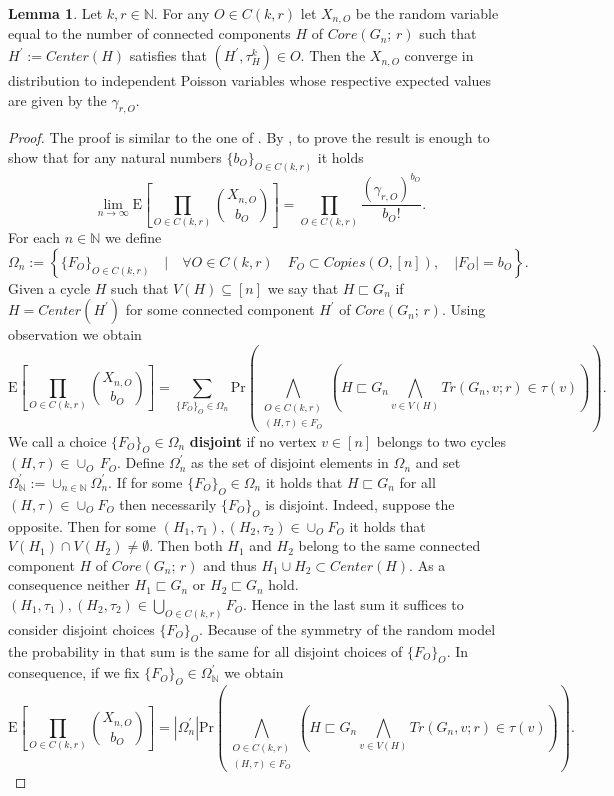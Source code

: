 \documentclass[12pt,notitlepage,a4paper]{article}
\theoremstyle{definition}
\newtheorem{lemma}{Lemma}[section]
\newcommand{\N}{\mathbb{N}}
\newcommand{\Ln}{\lim\limits_{n\to \infty}}
\begin{document}
\begin{lemma}
	Let $k,r\in \N$. For any $O\in C(k,r)$ let $X_{n,O}$ be
	the random variable equal to the number of connected components
	$H$ of $Core(G_n;\, r)$ such that $H^\prime:=Center(H)$
	satisfies that $(H^\prime, \tau^k_{H})\in O$. Then the
	$X_{n,O}$ converge in distribution to independent 
	Poisson variables whose respective expected values are given by the 
	$\gamma_{r,O}$.
\end{lemma}
\begin{proof}
The proof is similar to the one of . 
By , to prove the result is enough to show
that for any natural numbers $\{b_O\}_{O\in C(k,r)}$ it holds 
\begin{equation} \label{eq:cycl_aux}
\Ln 
\mathrm{E}\left[
\prod_{O\in C(k,r)}
\binom{X_{n,O}}{b_O}
\right]= \prod_{O\in C(k,r)} 
\frac{(\gamma_{r,O})^{b_O}}{b_O!}.
\end{equation}
For each $n\in \N$ we define
\[
\Omega_n:=\left\{
\{F_O\}_{O\in C(k,r)} \quad \Big|
\quad \forall O\in C(k,r) \quad
F_O\subset Copies(O,[n]), \quad
|F_O|=b_O	
\right\}.
\]
Given a cycle $H$ such that $V(H)\subseteq [n]$ we say 
that $H\sqsubset G_n$ if $H=Center(H^\prime)$ for some connected 
component $H^\prime$ of $Core(G_n;\, r)$.
Using observation  we obtain
\[
\mathrm{E}\left[
\prod_{O\in C(k,r)}
\binom{X_{n,O}}{b_O}
\right]=
\sum_{\{F_O\}_{O}\in \Omega_n}
\mathrm{Pr}\left(
\bigwedge_{
	\substack{
		O\in C(k,r)\\
		(H,\tau)\in F_O
}}
\left(
H\sqsubset G_n
\bigwedge_{v\in V(H)}
Tr(G_n,v;r)\in \tau(v)
\right)
\right).
\]
We call a choice $\{F_O\}_O\in \Omega_n$ \textbf{disjoint} if no 
vertex $v\in [n]$ belongs to two cycles $(H,\tau)\in \cup_O \, F_O$. 
Define $\Omega_n^\prime$ as the set of disjoint elements in $\Omega_n$
and set $\Omega_\N^\prime:=\cup_{n\in \N} \Omega^\prime_n$.
If for some $\{F_O\}_O\in \Omega_n$ it holds that $H \sqsubset G_n$
for all $(H,\tau)\in \cup_O F_O$ then necessarily $\{F_O\}_O$ is disjoint. 
Indeed, suppose the opposite. Then for some $(H_1,\tau_1), (H_2,\tau_2)\in \cup_O F_O$ 
it holds that $V(H_1)\cap V(H_2)\neq \emptyset$. Then both $H_1$ and $H_2$ belong
to the same connected component $H$ of $Core(G_n;\,r)$ and thus $H_1\cup H_2\subset
Center(H)$. As a consequence neither $H_1\sqsubset G_n$ or $H_2\sqsubset G_n$ hold. 
$(H_1,\tau_1),(H_2,\tau_2)\in \bigcup_{O\in C(k,r)} F_O$. Hence 
in the last sum it suffices to consider disjoint choices $\{F_O\}_O$. 
Because of the symmetry of the random model the probability
in that sum is the same for all disjoint choices of
$\{F_O\}_O$.
In consequence, if we fix
$\{F_O\}_{O}\in \Omega^\prime_\N$
we obtain
\begin{equation}\label{eq:cycl_aux1}
\mathrm{E}\left[
\prod_{O\in C(k,r)}
\binom{X_{n,O}}{b_O}
\right]=
|\Omega^\prime_n| 
\mathrm{Pr}\left(
\bigwedge_{
	\substack{
		O\in C(k,r)\\
		(H,\tau)\in F_O
}}
\left(
H\sqsubset G_n
\bigwedge_{v\in V(H)}
Tr(G_n,v;r)\in \tau(v)
\right)
\right).
\end{equation}


\end{proof}
\end{document}
